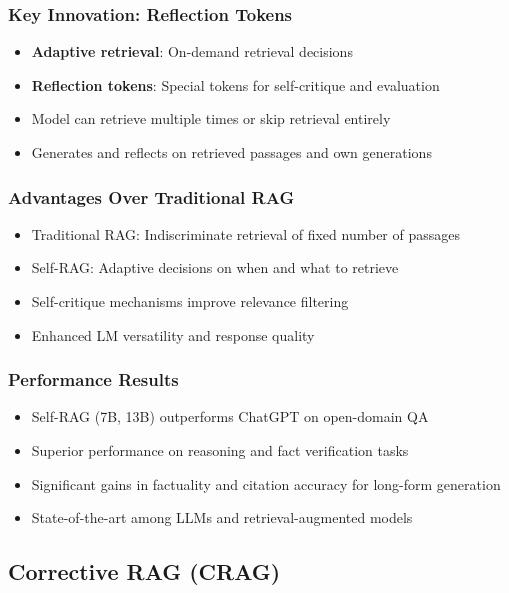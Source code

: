 \documentclass[11pt,letterpaper]{article}
\begin{document}
\subsubsection{Key Innovation: Reflection Tokens}
\begin{itemize}[leftmargin=*]
    \item \textbf{Adaptive retrieval}: On-demand retrieval decisions
    \item \textbf{Reflection tokens}: Special tokens for self-critique and evaluation
    \item Model can retrieve multiple times or skip retrieval entirely
    \item Generates and reflects on retrieved passages and own generations
\end{itemize}

\subsubsection{Advantages Over Traditional RAG}
\begin{itemize}[leftmargin=*]
    \item Traditional RAG: Indiscriminate retrieval of fixed number of passages
    \item Self-RAG: Adaptive decisions on when and what to retrieve
    \item Self-critique mechanisms improve relevance filtering
    \item Enhanced LM versatility and response quality
\end{itemize}

\subsubsection{Performance Results}
\begin{itemize}[leftmargin=*]
    \item Self-RAG (7B, 13B) outperforms ChatGPT on open-domain QA
    \item Superior performance on reasoning and fact verification tasks
    \item Significant gains in factuality and citation accuracy for long-form generation
    \item State-of-the-art among LLMs and retrieval-augmented models
\end{itemize}

\subsection{Corrective RAG (CRAG)}
\end{document}

